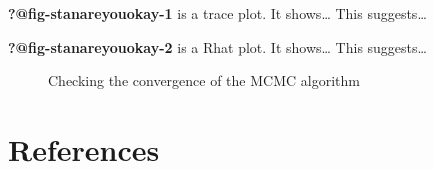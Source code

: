 \documentclass[
  letterpaper,
  DIV=11,
  numbers=noendperiod]{scrartcl}
\begin{document}
\textbf{?@fig-stanareyouokay-1} is a trace plot. It shows\ldots{} This
suggests\ldots{}

\textbf{?@fig-stanareyouokay-2} is a Rhat plot. It shows\ldots{} This
suggests\ldots{}

\begin{figure}

\begin{minipage}{0.50\linewidth}
Checking the convergence of the MCMC algorithm\end{minipage}%

\end{figure}%

\newpage

\section*{References}\label{references}
\end{document}
